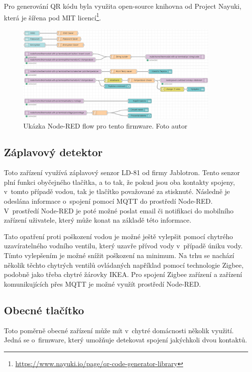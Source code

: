 Pro generování QR kódu byla využita open-source knihovna od Project Nayuki, která je šířena pod MIT licencí\footnote{\url{https://www.nayuki.io/page/qr-code-generator-library}}.

\begin{figure}[H]
  \centering
  \includegraphics[width=0.9\textwidth]{obrazky-figures/flows/thermostatFlow.PNG}
  \caption{Ukázka Node-RED flow pro tento firmware. Foto autor}
  \label{nodeRedThermostatFlow}
\end{figure}

\subsection*{Záplavový detektor}
Toto zařízení využívá záplavový senzor LD-81 od firmy Jablotron. Tento senzor plní funkci obyčejného tlačítka, a to tak, že pokud jsou oba kontakty spojeny, v~tomto případě vodou, tak je tlačítko považované za stisknuté. Následně je odeslána informace o~spojení pomocí MQTT do prostředí Node-RED. 
V~prostředí Node-RED je poté možné poslat email či notifikaci do mobilního zařízení uživatele, který může konat na základě této informace. 

Tato opatření proti poškození vodou je možné ještě vylepšit pomocí chytrého uzavíratelného vodního ventilu, který uzavře přívod vody v~případě úniku vody. Tímto vylepšením je možné snížit poškození na minimum. Na trhu se nachází několik těchto chytrých ventilů ovládaných například pomocí technologie Zigbee, podobně jako třeba chytré žárovky IKEA. Pro spojení Zigbee zařízení a zařízení komunikujících přes MQTT je možné využít prostředí Node-RED.

\subsection*{Obecné tlačítko}
Toto poměrně obecné zařízení může mít v~chytré domácnosti několik využití. Jedná se o~firmware, který umožňuje detekovat spojení jakýchkoli dvou kontaktů. 

